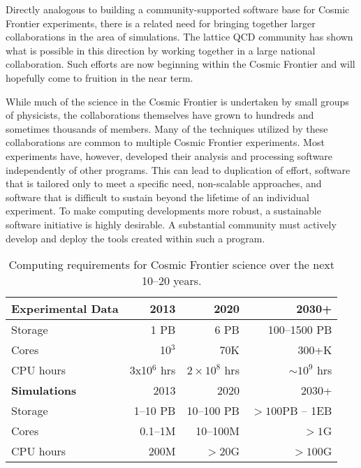 Directly analogous to building a community-supported software base for
Cosmic Frontier experiments, there is a related need for bringing
together larger collaborations in the area of simulations. The lattice
QCD community has shown what is possible in this direction by working
together in a large national collaboration. Such efforts are now
beginning within the Cosmic Frontier and will hopefully come to
fruition in the near term.

While much of the science in the Cosmic Frontier is undertaken by
small groups of physicists, the collaborations themselves have grown
to hundreds and sometimes thousands of members. Many of the techniques
utilized by these collaborations are common to multiple Cosmic
Frontier experiments. Most experiments have, however, developed their
analysis and processing software independently of other programs. This
can lead to duplication of effort, software that is tailored only to
meet a specific need, non-scalable approaches, and software that is
difficult to sustain beyond the lifetime of an individual
experiment. To make computing developments more robust, a sustainable
software initiative is highly desirable. A substantial community must actively
develop and deploy the tools created within such a program.


\begin{center}
\begin{table}
\caption{Computing requirements for Cosmic Frontier science over the next
 10--20 years.}
\begin{center}
\begin{tabular}{|l|r|r|r|} 
 \hline 
{\bf Experimental Data} & 2013 & 2020 & 2030+ \\
\hline
Storage & 1 PB & 6 PB & 100--1500 PB \\
Cores & 10$^3$ & 70K & 300+K \\
CPU hours & 3x10$^6$ hrs & $2\times 10^8$ hrs & $\sim 10^9$ hrs \\
 \hline 
{\bf Simulations} &2013 & 2020 & 2030+ \\
 \hline 
Storage & 1--10 PB & 10--100 PB & $> 100 $PB -- 1EB\\
Cores & 0.1--1M & 10--100M &$> 1$G\\
CPU hours & 200M & $>$20G & $> 100$G\\
\hline
\end{tabular}
\end{center}
\label{tab:CosmicCompNeeds}
\end{table}
\end{center}

